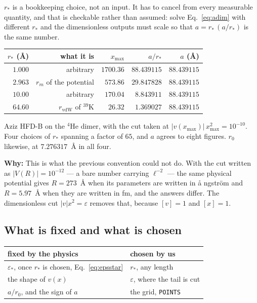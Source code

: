 \documentclass[11pt,a4paper]{article}
\newcommand{\why}[1]{\medskip\noindent\textbf{Why:} #1\medskip}
\begin{document}
$r_*$ is a bookkeeping choice, not an input. It has to cancel from every
measurable quantity, and that is checkable rather than assumed: solve
Eq.~\eqref{eq:adim} with different $r_*$ and the dimensionless outputs must
scale so that $a = r_*\,(a/r_*)$ is the same number.

\begin{center}
\small
\begin{tabular}{@{}rrrrr@{}}
\toprule
$r_*$ (\AA) & what it is & $x_{\max}$ & $a/r_*$ & $a$ (\AA) \\
\midrule
$1.000$ & arbitrary & $1700.36$ & $88.439115$ & $88.439115$ \\
$2.963$ & $r_m$ of the potential & $573.86$ & $29.847828$ & $88.439115$ \\
$10.00$ & arbitrary & $170.04$ & $8.843911$ & $88.439115$ \\
$64.60$ & $r_{\mathrm{vdW}}$ of $^{39}$K & $26.32$ & $1.369027$ & $88.439115$ \\
\bottomrule
\end{tabular}
\end{center}

\noindent
Aziz HFD-B on the $^4$He dimer, with the cut taken at
$|v(x_{\max})|\,x_{\max}^2 = 10^{-10}$. Four choices of $r_*$ spanning a factor
of $65$, and $a$ agrees to eight figures. $r_0$ likewise, at $7.276317$~\AA{} in
all four.

\why{This is what the previous convention could not do. With the cut written as
$|V(R)| = 10^{-12}$ --- a bare number carrying $\ell^{-2}$ --- the same physical
potential gives $R = 273$~\AA{} when its parameters are written in \aa
ngstr\"om and $R = 5.97$~\AA{} when they are written in fm, and the answers
differ. The dimensionless cut $|v|x^2 = \varepsilon$ removes that, because
$[v] = 1$ and $[x] = 1$.}

\subsection{What is fixed and what is chosen}

\begin{center}
\small
\begin{tabular}{@{}ll@{}}
\toprule
fixed by the physics & chosen by us \\
\midrule
$\varepsilon_*$, once $r_*$ is chosen, Eq.~\eqref{eq:epsstar} & $r_*$, any length \\
the shape of $v(x)$ & $\varepsilon$, where the tail is cut \\
$a/r_0$, and the sign of $a$ & the grid, \texttt{POINTS} \\
\bottomrule
\end{tabular}
\end{center}
\end{document}
